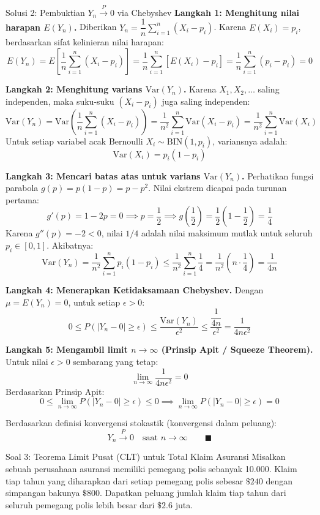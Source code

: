 \documentclass[10pt,twoside]{article}
\begin{document}
\begin{solbox}{Solusi 2: Pembuktian $Y_n \xrightarrow{P} 0$ via Chebyshev}
\textbf{Langkah 1: Menghitung nilai harapan $E(Y_n)$.}
Diberikan $Y_n = \dfrac{1}{n} \sum_{i=1}^n (X_i - p_i)$. Karena $E(X_i) = p_i$, berdasarkan sifat kelinieran nilai harapan:
\[
E(Y_n) = E\left[\frac{1}{n} \sum_{i=1}^n (X_i - p_i)\right] = \frac{1}{n} \sum_{i=1}^n \left[E(X_i) - p_i\right] = \frac{1}{n} \sum_{i=1}^n (p_i - p_i) = 0
\]

\textbf{Langkah 2: Menghitung varians $\mathrm{Var}(Y_n)$.}
Karena $X_1, X_2, \dots$ saling independen, maka suku-suku $(X_i - p_i)$ juga saling independen:
\[
\mathrm{Var}(Y_n) = \mathrm{Var}\left(\frac{1}{n} \sum_{i=1}^n (X_i - p_i)\right) = \frac{1}{n^2} \sum_{i=1}^n \mathrm{Var}(X_i - p_i) = \frac{1}{n^2} \sum_{i=1}^n \mathrm{Var}(X_i)
\]
Untuk setiap variabel acak Bernoulli $X_i \sim \text{BIN}(1, p_i)$, variansnya adalah:
\[
\mathrm{Var}(X_i) = p_i(1 - p_i)
\]

\textbf{Langkah 3: Mencari batas atas untuk varians $\mathrm{Var}(Y_n)$.}
Perhatikan fungsi parabola $g(p) = p(1 - p) = p - p^2$. Nilai ekstrem dicapai pada turunan pertama:
\[
g'(p) = 1 - 2p = 0 \implies p = \frac{1}{2} \implies g\left(\frac{1}{2}\right) = \frac{1}{2}\left(1 - \frac{1}{2}\right) = \frac{1}{4}
\]
Karena $g''(p) = -2 < 0$, nilai $1/4$ adalah nilai maksimum mutlak untuk seluruh $p_i \in [0, 1]$.
Akibatnya:
\[
\mathrm{Var}(Y_n) = \frac{1}{n^2} \sum_{i=1}^n p_i(1 - p_i) \le \frac{1}{n^2} \sum_{i=1}^n \frac{1}{4} = \frac{1}{n^2} \left(n \cdot \frac{1}{4}\right) = \frac{1}{4n}
\]

\textbf{Langkah 4: Menerapkan Ketidaksamaan Chebyshev.}
Dengan $\mu = E(Y_n) = 0$, untuk setiap $\epsilon > 0$:
\[
0 \le P(|Y_n - 0| \ge \epsilon) \le \frac{\mathrm{Var}(Y_n)}{\epsilon^2} \le \frac{\dfrac{1}{4n}}{\epsilon^2} = \frac{1}{4n\epsilon^2}
\]

\textbf{Langkah 5: Mengambil limit $n \to \infty$ (Prinsip Apit / Squeeze Theorem).}
Untuk nilai $\epsilon > 0$ sembarang yang tetap:
\[
\lim_{n \to \infty} \frac{1}{4n\epsilon^2} = 0
\]
Berdasarkan Prinsip Apit:
\[
0 \le \lim_{n \to \infty} P(|Y_n - 0| \ge \epsilon) \le 0 \implies \lim_{n \to \infty} P(|Y_n - 0| \ge \epsilon) = 0
\]

Berdasarkan definisi konvergensi stokastik (konvergensi dalam peluang):
\[
\boxed{Y_n \xrightarrow{P} 0 \quad \text{saat } n \to \infty} \qquad \blacksquare
\]
\end{solbox}

\begin{soalbox}{Soal 3: Teorema Limit Pusat (CLT) untuk Total Klaim Asuransi}
Misalkan sebuah perusahaan asuransi memiliki pemegang polis sebanyak 10.000. Klaim tiap tahun yang diharapkan dari setiap pemegang polis sebesar $\$240$ dengan simpangan bakunya $\$800$. Dapatkan peluang jumlah klaim tiap tahun dari seluruh pemegang polis lebih besar dari $\$2.6$ juta.
\end{soalbox}
\end{document}
